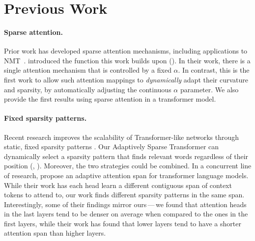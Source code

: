\section{Previous Work}

\paragraph*{Sparse attention.}
Prior work has developed sparse attention mechanisms, including
applications to NMT~\citep{sparsemax, malaviya2018sparse, fusedmax,
    shao2019ssn, maruf2019selective}. \citet{entmax} introduced the
\entmaxtext function this work builds upon (). In their work, there is a
single attention mechanism that is controlled by a fixed $\alpha$.
In contrast, this is the first work to allow such attention mappings
to \emph{dynamically} adapt their curvature and sparsity, by
automatically adjusting the continuous $\alpha$ parameter. We also
provide the first results using sparse attention in a transformer
model.

\paragraph*{Fixed sparsity patterns.}
Recent research improves the scalability of Transformer-like networks
through static, fixed sparsity patterns
\citep{openai_sparse_transf,dynamic_conv}. Our Adaptively Sparse
Transformer can dynamically select a sparsity pattern that finds
relevant words regardless of their position (\eg,
). Moreover, the two strategies could be
combined. In a concurrent line of research, \citet{Sukhbaatar2019}
propose an adaptive attention span for transformer language models.
While their work has each head learn a different contiguous span of
context tokens to attend to, our work finds different sparsity
patterns in the same span. Interestingly, some of their findings
mirror ours\,---\,we found that attention heads in the last layers tend
to be denser on average when compared to the ones in the first
layers, while their work has found that lower layers tend to have a
shorter attention span than higher layers.

